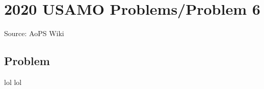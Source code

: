\documentclass[12pt]{article}
\begin{document}
\section*{{2020 USAMO Problems/Problem 6}}
Source: AoPS Wiki

\subsection*{Problem}
lol lol
\end{document}
